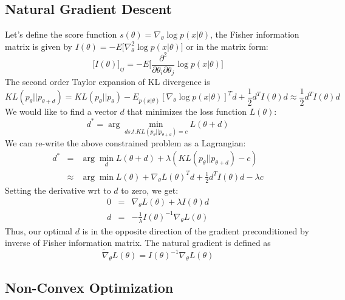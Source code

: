 \subsection{Natural Gradient Descent}

Let's define the score function $s(\theta) = \nabla_{\theta}\log p(x|\theta)$, the Fisher information matrix is given by $I(\theta) = -E\bigg[\nabla_{\theta}^{2}\log p(x|\theta) \bigg]$ or in the matrix form:
\begin{equation}
    \bigg[I(\theta)\bigg]_{ij} = -E \bigg[\frac{\partial^2}{\partial \theta_i \partial \theta_j}\log p(x|\theta) \bigg]
\end{equation}
The second order Taylor expansion of KL divergence is
\begin{equation}
    KL(p_{\theta}||p_{\theta+d}) = KL(p_{\theta}||p_{\theta}) - E_{p(x|\theta)}[\nabla_{\theta}\log p(x|\theta)]^{T}d + \frac{1}{2}d^{T}I(\theta)d \approx \frac{1}{2}d^{T}I(\theta)d 
\end{equation}
We would like to find a vector $d$ that minimizes the loss function $L(\theta)$:
\begin{equation}
    d^{\ast} = \arg \min_{d s.t. KL(p_{\theta}||p_{\theta+d}) = c} L(\theta + d)
\end{equation}
We can re-write the above constrained problem as a Lagrangian:
\begin{eqnarray}
    d^{\ast} &=& \arg \min_d L(\theta + d) + \lambda (KL(p_{\theta}||p_{\theta + d})-c) \\
    &\approx& \arg \min L(\theta) + \nabla_{\theta}L(\theta)^{T}d + \frac{1}{2}d^{T}I(\theta)d - \lambda c
\end{eqnarray}
Setting the derivative wrt to $d$ to zero, we get:
\begin{eqnarray}
    0 &=& \nabla_{\theta}L(\theta) + \lambda I(\theta) d \\
    d &=& -\frac{1}{\lambda}I(\theta)^{-1}\nabla_{\theta}L(\theta)
\end{eqnarray}
Thus, our optimal $d$ is in the opposite direction of the gradient preconditioned by inverse of Fisher information matrix. The natural gradient is defined as
\begin{equation}
    \tilde{\nabla}_\theta L (\theta) = I(\theta)^{-1}\nabla_{\theta}L(\theta)
\end{equation}

\subsection{Non-Convex Optimization}

